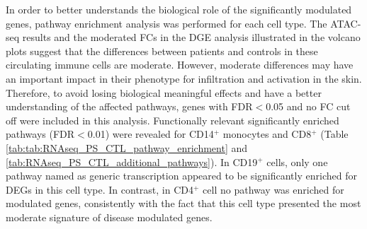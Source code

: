 In order to better understands the biological role of the significantly modulated genes, pathway enrichment analysis was performed for each cell type. The ATAC-seq results and the moderated FCs in the DGE analysis illustrated in the volcano plots suggest that the differences between patients and controls in these circulating immune cells are moderate. However, moderate differences may have an important impact in their phenotype for infiltration and activation in the skin. Therefore, to avoid losing biological meaningful effects and have a better understanding of the affected pathways, genes with FDR$<$0.05 and no FC cut off were included in this analysis. Functionally relevant significantly enriched pathways (FDR$<$0.01) were revealed for CD14$^+$ monocytes and CD8$^+$ (Table \ref{tab:tab:RNAseq_PS_CTL_pathway_enrichment} and \ref{tab:RNAseq_PS_CTL_additional_pathways}). In CD19$^+$ cells, only one pathway named as generic transcription appeared to be significantly enriched for DEGs in this cell type. In contrast, in CD4$^+$ cell no pathway was enriched for modulated genes, consistently with the fact that this cell type presented the most moderate signature of disease modulated genes. 

